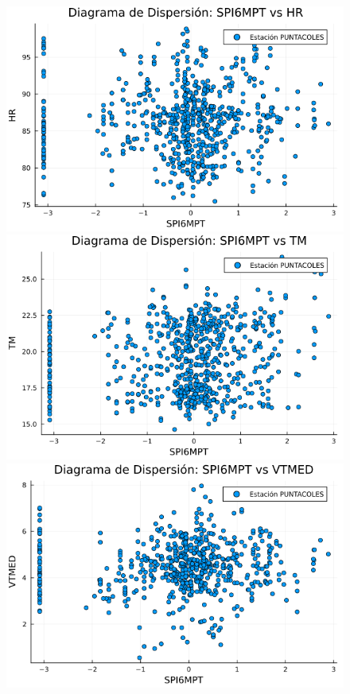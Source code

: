 \begin{figure}[htbp]
\begin{minipage}{0.32\textwidth}
    \centering
    \includegraphics[width=\linewidth]{Capitulos/Scaterplot/PUNTACOLES_SPI6MPT_vs_HR.png}
\end{minipage}\hfill
\begin{minipage}{0.32\textwidth}
    \centering
    \includegraphics[width=\linewidth]{Capitulos/Scaterplot/PUNTACOLES_SPI6MPT_vs_TM.png}
\end{minipage}\hfill
\begin{minipage}{0.32\textwidth}
    \centering
    \includegraphics[width=\linewidth]{Capitulos/Scaterplot/PUNTACOLES_SPI6MPT_vs_VTMED.png}
\end{minipage}


\end{figure}
